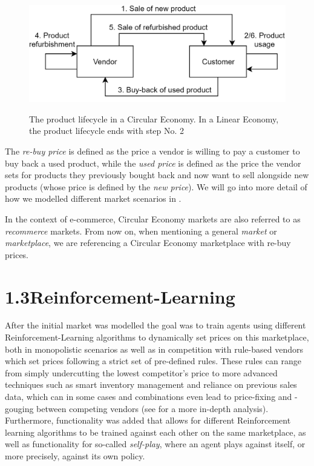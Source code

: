 \begin{figure}
	\centering
	\includegraphics[width = \textwidth]{images/product_lifecycle.png}\\[1 ex]
	\caption{The product lifecycle in a Circular Economy. In a Linear Economy, the product lifecycle ends with step No. 2}\label{fig:IntroMarketDynamics}
\end{figure}

The \emph{re-buy price} is defined as the price a vendor is willing to pay a customer to buy back a used product, while the \emph{used price} is defined as the price the vendor sets for products they previously bought back and now want to sell alongside new products (whose price is defined by the \emph{new price}). We will go into more detail of how we modelled different market scenarios in .

In the context of e-commerce, Circular Economy markets are also referred to as \emph{recommerce} markets. From now on, when mentioning a general \emph{market} or \emph{marketplace}, we are referencing a Circular Economy marketplace with re-buy prices.

\section*{1.3\space\space Reinforcement-Learning}\label{sec:ReinforcementLearningIntroduction}

After the initial market was modelled the goal was to train agents using different Reinforcement-Learning algorithms to dynamically set prices on this marketplace, both in monopolistic scenarios as well as in competition with rule-based vendors which set prices following a strict set of pre-defined rules. These rules can range from simply undercutting the lowest competitor's price to more advanced techniques such as smart inventory management and reliance on previous sales data, which can in some cases and combinations even lead to price-fixing and -gouging between competing vendors (see  for a more in-depth analysis). Furthermore, functionality was added that allows for different Reinforcement learning algorithms to be trained against each other on the same marketplace, as well as functionality for so-called \emph{self-play}, where an agent plays against itself, or more precisely, against its own policy.

